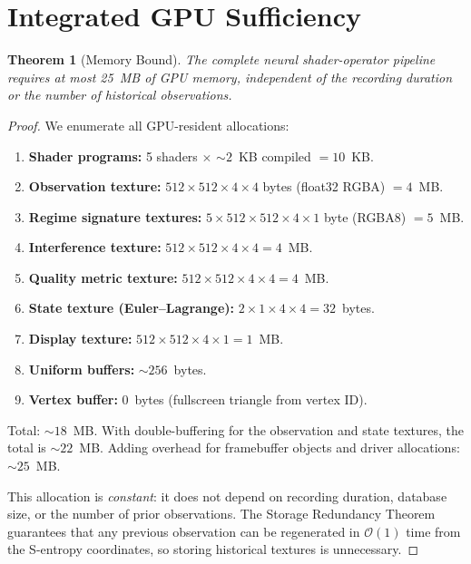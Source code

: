 \documentclass[11pt,twocolumn,a4paper]{article}
\newtheorem{theorem}{Theorem}[section]
\newcommand{\BigO}{\mathcal{O}}
\begin{document}

\section{Integrated GPU Sufficiency}
\label{sec:hardware}

\begin{theorem}[Memory Bound]
\label{thm:memory}
The complete neural shader-operator pipeline requires at most 25~MB of GPU memory, independent of the recording duration or the number of historical observations.
\end{theorem}

\begin{proof}
We enumerate all GPU-resident allocations:

\begin{enumerate}[leftmargin=*,itemsep=1pt]
\item \textbf{Shader programs:} 5 shaders $\times$ $\sim\!2$~KB compiled $= 10$~KB.
\item \textbf{Observation texture:} $512 \times 512 \times 4 \times 4$ bytes (float32 RGBA) $= 4$~MB.
\item \textbf{Regime signature textures:} $5 \times 512 \times 512 \times 4 \times 1$ byte (RGBA8) $= 5$~MB.
\item \textbf{Interference texture:} $512 \times 512 \times 4 \times 4 = 4$~MB.
\item \textbf{Quality metric texture:} $512 \times 512 \times 4 \times 4 = 4$~MB.
\item \textbf{State texture (Euler--Lagrange):} $2 \times 1 \times 4 \times 4 = 32$~bytes.
\item \textbf{Display texture:} $512 \times 512 \times 4 \times 1 = 1$~MB.
\item \textbf{Uniform buffers:} $\sim\!256$~bytes.
\item \textbf{Vertex buffer:} 0~bytes (fullscreen triangle from vertex ID).
\end{enumerate}

Total: $\sim\!18$~MB.
With double-buffering for the observation and state textures, the total is $\sim\!22$~MB.
Adding overhead for framebuffer objects and driver allocations: $\sim\!25$~MB.

This allocation is \emph{constant}: it does not depend on recording duration, database size, or the number of prior observations.
The Storage Redundancy Theorem~\cite{sachikonye2026gpu} guarantees that any previous observation can be regenerated in $\BigO(1)$ time from the S-entropy coordinates, so storing historical textures is unnecessary.
\end{proof}
\end{document}
